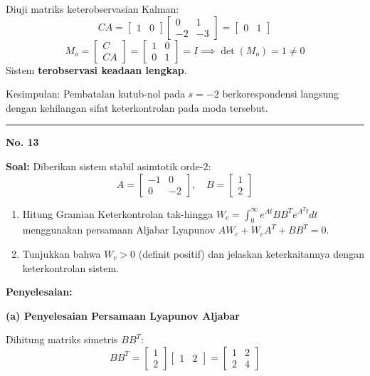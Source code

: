 \documentclass[11pt,a4paper]{article}
\begin{document}
Diuji matriks keterobservasian Kalman:
$$CA = \begin{bmatrix} 1 & 0 \end{bmatrix} \begin{bmatrix} 0 & 1 \\ -2 & -3 \end{bmatrix} = \begin{bmatrix} 0 & 1 \end{bmatrix}$$
$$M_o = \begin{bmatrix} C \\ CA \end{bmatrix} = \begin{bmatrix} 1 & 0 \\ 0 & 1 \end{bmatrix} = I \implies \det(M_o) = 1 \ne 0$$
Sistem \textbf{terobservasi keadaan lengkap}.

Kesimpulan: Pembatalan kutub-nol pada $s = -2$ berkorespondensi langsung dengan kehilangan sifat keterkontrolan pada moda tersebut.

\vspace{12pt}
\hrule
\vspace{10pt}

\textbf{\large No. 13}

\textbf{Soal:}  
Diberikan sistem stabil asimtotik orde-2:
$$A = \begin{bmatrix} -1 & 0 \\ 0 & -2 \end{bmatrix}, \quad B = \begin{bmatrix} 1 \\ 2 \end{bmatrix}$$
\begin{enumerate}[label=(\alph*)]
    \item Hitung Gramian Keterkontrolan tak-hingga $W_c = \int_0^\infty e^{At} B B^T e^{A^T t} dt$ menggunakan persamaan Aljabar Lyapunov $A W_c + W_c A^T + B B^T = 0$.
    \item Tunjukkan bahwa $W_c > 0$ (definit positif) dan jelaskan keterkaitannya dengan keterkontrolan sistem.
\end{enumerate}

\textbf{Penyelesaian:}

\textbf{(a) Penyelesaian Persamaan Lyapunov Aljabar}

Dihitung matriks simetris $B B^T$:
$$B B^T = \begin{bmatrix} 1 \\ 2 \end{bmatrix} \begin{bmatrix} 1 & 2 \end{bmatrix} = \begin{bmatrix} 1 & 2 \\ 2 & 4 \end{bmatrix}$$
\end{document}
